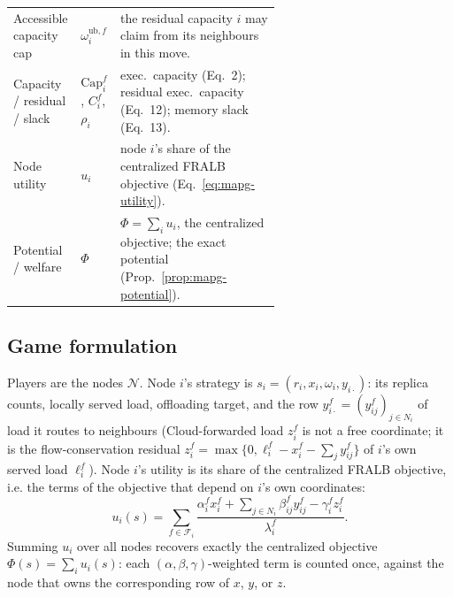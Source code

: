 \begin{table}[t]
\begin{tabular}{@{}l l p{0.6\linewidth}@{}}
Accessible capacity cap & $\omega_i^{\mathrm{ub},f}$ & the residual capacity $i$ may claim from its neighbours in this move.\\
Capacity / residual / slack & $\mathrm{Cap}_i^f$, $C_i^f$, $\rho_i$ & exec.\ capacity (Eq.~2); residual exec.\ capacity (Eq.~12); memory slack (Eq.~13).\\
Node utility & $u_i$ & node $i$'s share of the centralized FRALB objective (Eq.~\eqref{eq:mapg-utility}).\\
Potential / welfare & $\Phi$ & $\Phi=\sum_i u_i$, the centralized objective; the exact potential (Prop.~\ref{prop:mapg-potential}).\\
\bottomrule
\end{tabular}
\end{table}

\subsection{Game formulation}
\label{sec:mapg-game}

Players are the nodes $\mathcal{N}$. Node $i$'s strategy is
$s_i=(r_i,x_i,\omega_i,y_{i\cdot})$: its replica counts, locally served load,
offloading target, and the row $y_{i\cdot}^f=(y_{ij}^f)_{j\in N_i}$ of load it
routes to neighbours (Cloud-forwarded load $z_i^f$ is not a free coordinate;
it is the flow-conservation residual $z_i^f=\max\{0,\ell_i^f-x_i^f-\sum_j y_{ij}^f\}$
of $i$'s own served load $\ell_i^f$). Node $i$'s utility is its share of the
centralized FRALB objective, i.e. the terms of the objective that depend on
$i$'s own coordinates:
\begin{equation}
  u_i(s) = \sum_{f\in\mathcal{F}_i}
    \frac{\alpha_i^f x_i^f + \sum_{j\in N_i}\beta_{ij}^f y_{ij}^f - \gamma_i^f z_i^f}
         {\lambda_i^f}.
  \label{eq:mapg-utility}
\end{equation}
Summing $u_i$ over all nodes recovers exactly the centralized objective
$\Phi(s)=\sum_i u_i(s)$: each $(\alpha,\beta,\gamma)$-weighted term is counted
once, against the node that owns the corresponding row of $x$, $y$, or $z$.

